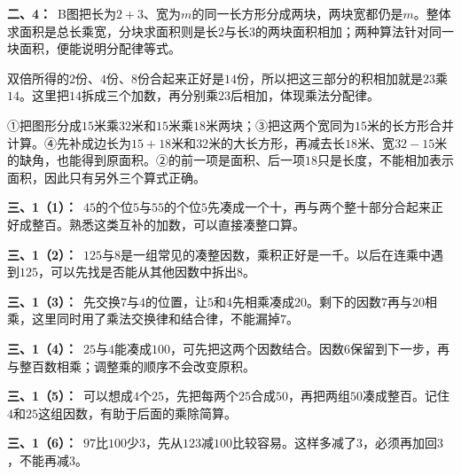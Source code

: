 \documentclass[multi=snippet,border=0pt]{standalone}
\newenvironment{snippet}[3]{\begin{minipage}{#1bp}\color{answerred}\fontsize{#2}{#3}\selectfont\raggedright}{\end{minipage}}
\begin{document}
\begin{snippet}{505}{11.5}{14}\textbf{二、4：}\ B图把长为\(2+3\)、宽为\(m\)的同一长方形分成两块，两块宽都仍是\(m\)。整体求面积是总长乘宽，分块求面积则是长\(2\)与长\(3\)的两块面积相加；两种算法针对同一块面积，便能说明分配律等式。\end{snippet}
\begin{snippet}{505}{11.5}{14}双倍所得的\(2\)份、\(4\)份、\(8\)份合起来正好是\(14\)份，所以把这三部分的积相加就是\(23\)乘\(14\)。这里把\(14\)拆成三个加数，再分别乘\(23\)后相加，体现乘法分配律。\end{snippet}
\begin{snippet}{505}{11.5}{14}①把图形分成\(15\)米乘\(32\)米和\(15\)米乘\(18\)米两块；③把这两个宽同为\(15\)米的长方形合并计算。④先补成边长为\(15+18\)米和\(32\)米的大长方形，再减去长\(18\)米、宽\(32-15\)米的缺角，也能得到原面积。②的前一项是面积、后一项\(18\)只是长度，不能相加表示面积，因此只有另外三个算式正确。\end{snippet}
\begin{snippet}{505}{11.5}{14}\textbf{三、1（1）：}\ \(45\)的个位\(5\)与\(55\)的个位\(5\)先凑成一个十，再与两个整十部分合起来正好成整百。熟悉这类互补的加数，可以直接凑整口算。\end{snippet}
\begin{snippet}{505}{11.5}{14}\textbf{三、1（2）：}\ \(125\)与\(8\)是一组常见的凑整因数，乘积正好是一千。以后在连乘中遇到\(125\)，可以先找是否能从其他因数中拆出\(8\)。\end{snippet}
\begin{snippet}{505}{11.5}{14}\textbf{三、1（3）：}\ 先交换\(7\)与\(4\)的位置，让\(5\)和\(4\)先相乘凑成\(20\)。剩下的因数\(7\)再与\(20\)相乘，这里同时用了乘法交换律和结合律，不能漏掉\(7\)。\end{snippet}
\begin{snippet}{505}{11.5}{14}\textbf{三、1（4）：}\ \(25\)与\(4\)能凑成\(100\)，可先把这两个因数结合。因数\(6\)保留到下一步，再与整百数相乘；调整乘的顺序不会改变原积。\end{snippet}
\begin{snippet}{505}{11.5}{14}\textbf{三、1（5）：}\ 可以想成\(4\)个\(25\)，先把每两个\(25\)合成\(50\)，再把两组\(50\)凑成整百。记住\(4\)和\(25\)这组因数，有助于后面的乘除简算。\end{snippet}
\begin{snippet}{505}{11.5}{14}\textbf{三、1（6）：}\ \(97\)比\(100\)少\(3\)，先从\(123\)减\(100\)比较容易。这样多减了\(3\)，必须再加回\(3\)，不能再减\(3\)。\end{snippet}
\end{document}
